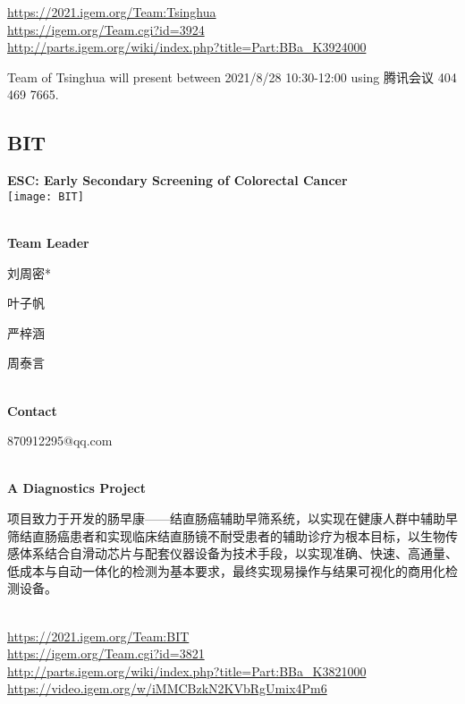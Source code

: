 \url{https://2021.igem.org/Team:Tsinghua }\\
\url{https://igem.org/Team.cgi?id=3924 }\\
\url{http://parts.igem.org/wiki/index.php?title=Part:BBa_K3924000 }\\


\vfill{}









Team of Tsinghua will present between     2021/8/28 10:30-12:00    using 腾讯会议 404 469 7665.
\newpage


\subsection{\textcolor{Blu}{ BIT } }
\vspace{5mm}
\begin{center}
\large{
  \textbf{ ESC: Early Secondary Screening of Colorectal Cancer }\\

  \texttt{[image: BIT]}
}
\end{center}
\textbf{\\Team Leader}

  刘周密*

  叶子帆

  严梓涵

  周泰言


\textbf{\\Contact}

  870912295@qq.com


\textbf{\\A Diagnostics Project\\}\begin{spacing}{1.5}

项目致力于开发的肠早康——结直肠癌辅助早筛系统，以实现在健康人群中辅助早筛结直肠癌患者和实现临床结直肠镜不耐受患者的辅助诊疗为根本目标，以生物传感体系结合自滑动芯片与配套仪器设备为技术手段，以实现准确、快速、高通量、低成本与自动一体化的检测为基本要求，最终实现易操作与结果可视化的商用化检测设备。\end{spacing}
\\

\url{https://2021.igem.org/Team:BIT }\\
\url{https://igem.org/Team.cgi?id=3821 }\\
\url{http://parts.igem.org/wiki/index.php?title=Part:BBa_K3821000 }\\
\url{https://video.igem.org/w/iMMCBzkN2KVbRgUmix4Pm6 }\\

